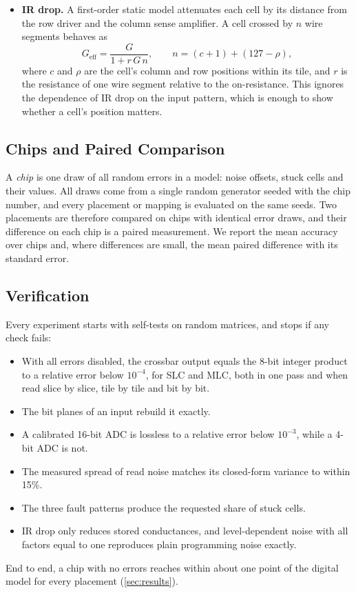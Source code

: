 \begin{itemize}
\item \textbf{IR drop.} A first-order static model attenuates each cell by its distance from the row
driver and the column sense amplifier. A cell crossed by $n$ wire segments behaves as
\begin{equation}
G_{\text{eff}}=\frac{G}{1+r\,G\,n},\qquad n=(c+1)+(127-\rho),
\label{eq:irdrop}
\end{equation}
where $c$ and $\rho$ are the cell's column and row positions within its tile, and $r$ is the resistance
of one wire segment relative to the on-resistance. This ignores the dependence of IR drop on the input
pattern, which is enough to show whether a cell's position matters.
\end{itemize}

\subsection{Chips and Paired Comparison}
A \emph{chip} is one draw of all random errors in a model: noise offsets, stuck cells and their values.
All draws come from a single random generator seeded with the chip number, and every placement or
mapping is evaluated on the same seeds. Two placements are therefore compared on chips with identical
error draws, and their difference on each chip is a paired measurement. We report the mean accuracy
over chips and, where differences are small, the mean paired difference with its standard error.

\subsection{Verification}
Every experiment starts with self-tests on random matrices, and stops if any check fails:
\begin{itemize}
\item With all errors disabled, the crossbar output equals the 8-bit integer product to a relative
error below $10^{-4}$, for SLC and MLC, both in one pass and when read slice by slice, tile by tile and
bit by bit.
\item The bit planes of an input rebuild it exactly.
\item A calibrated 16-bit ADC is lossless to a relative error below $10^{-3}$, while a 4-bit ADC is not.
\item The measured spread of read noise matches its closed-form variance to within 15\%.
\item The three fault patterns produce the requested share of stuck cells.
\item IR drop only reduces stored conductances, and level-dependent noise with all factors equal to one
reproduces plain programming noise exactly.
\end{itemize}
End to end, a chip with no errors reaches within about one point of the digital model for every placement
(\cref{sec:results}).
